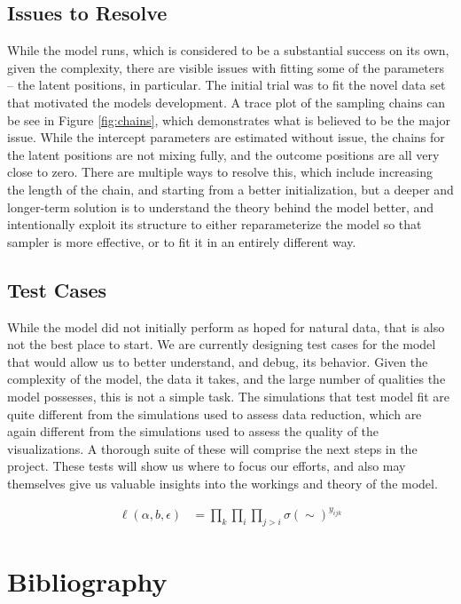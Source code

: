 \documentclass[11pt]{scrartcl}
\begin{document}
\subsection{Issues to Resolve}
While the model runs, which is considered to be a substantial success on its own, given the complexity, there are visible issues with fitting some of the parameters -- the latent positions, in particular. The initial trial was to fit the novel data set that motivated the models development. A trace plot of the sampling chains can be see in Figure \ref{fig:chains}, which demonstrates what is believed to be the major issue. While the intercept parameters are estimated without issue, the chains for the latent positions are not mixing fully, and the outcome positions are all very close to zero. There are multiple ways to resolve this, which include increasing the length of the chain, and starting from a better initialization, but a deeper and longer-term solution is to understand the theory behind the model better, and intentionally exploit its structure to either reparameterize the model so that sampler is more effective, or to fit it in an entirely different way. 

\subsection{Test Cases}
While the model did not initially perform as hoped for natural data, that is also not the best place to start. We are currently designing test cases for the model that would allow us to better understand, and debug, its behavior. Given the complexity of the model, the data it takes, and the large number of qualities the model possesses, this is not a simple task. The simulations that test model fit are quite different from the simulations used to assess data reduction, which are again different from the simulations used to assess the quality of the visualizations. A thorough suite of these will comprise the next steps in the project. These tests will show us where to focus our efforts, and also may themselves give us valuable insights into the workings and theory of the model.


\begin{align}
\ell(\alpha, b, \epsilon) &= \prod_k \prod_i \prod_{j > i} \sigma(\sim)^{y_{ijk}}
\end{align}


\section{Bibliography}
\end{document}
